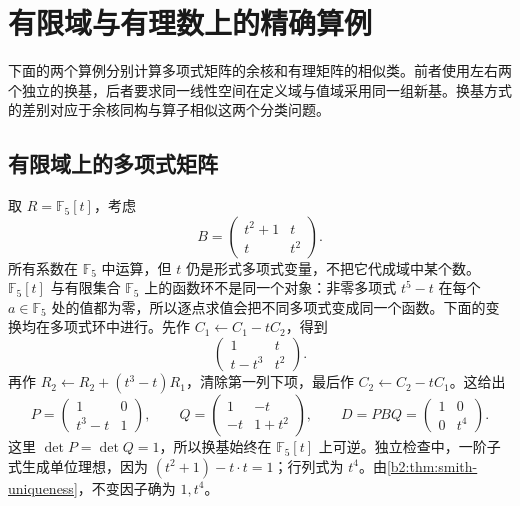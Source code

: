 
%
%

\section{有限域与有理数上的精确算例}
\label{b2:sec:A04}

下面的两个算例分别计算多项式矩阵的余核和有理矩阵的相似类。前者使用左右两个独立的换基，后者要求同一线性空间在定义域与值域采用同一组新基。换基方式的差别对应于余核同构与算子相似这两个分类问题。

\subsection{有限域上的多项式矩阵}
\label{b2:subsec:A04:01}

取 \(R=\mathbb F_5[t]\)，考虑
\[
	B=\begin{pmatrix}t^2+1&t\\t&t^2\end{pmatrix}.
\]
所有系数在 \(\mathbb F_5\) 中运算，但 \(t\) 仍是形式多项式变量，不把它代成域中某个数。\(\mathbb F_5[t]\) 与有限集合 \(\mathbb F_5\) 上的函数环不是同一个对象：非零多项式 \(t^5-t\) 在每个 \(a\in\mathbb F_5\) 处的值都为零，所以逐点求值会把不同多项式变成同一个函数。下面的变换均在多项式环中进行。先作 \(C_1\leftarrow C_1-tC_2\)，得到
\[
	\begin{pmatrix}1&t\\t-t^3&t^2\end{pmatrix}.
\]
再作 \(R_2\leftarrow R_2+(t^3-t)R_1\)，清除第一列下项，最后作 \(C_2\leftarrow C_2-tC_1\)。这给出
\begin{equation}\label{b2:eq:A-polynomial-certificate}
	P=\begin{pmatrix}1&0\\t^3-t&1\end{pmatrix},\qquad
	Q=\begin{pmatrix}1&-t\\-t&1+t^2\end{pmatrix},\qquad
	D=PBQ=\begin{pmatrix}1&0\\0&t^4\end{pmatrix}.
\end{equation}
这里 \(\det P=\det Q=1\)，所以换基始终在 \(\mathbb F_5[t]\) 上可逆。独立检查中，一阶子式生成单位理想，因为 \((t^2+1)-t\cdot t=1\)；行列式为 \(t^4\)。由\cref{b2:thm:smith-uniqueness}，不变因子确为 \(1,t^4\)。

